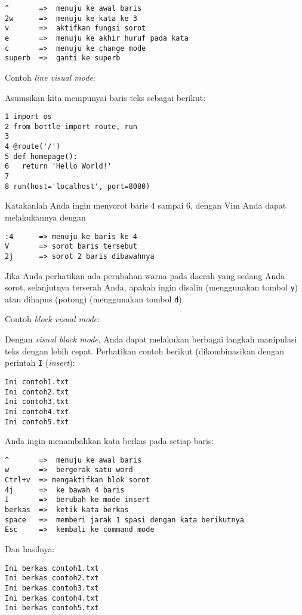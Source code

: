 \documentclass{article}
\begin{document}
\begin{verbatim}
^       =>  menuju ke awal baris
2w      =>  menuju ke kata ke 3
v       =>  aktifkan fungsi sorot
e       =>  menuju ke akhir huruf pada kata
c       =>  menuju ke change mode
superb  =>  ganti ke superb
\end{verbatim}


Contoh \emph{line visual mode}:

Asumsikan kita mempunyai baris teks sebagai berikut:

\begin{verbatim}
1 import os
2 from bottle import route, run
3
4 @route('/')
5 def homepage():
6   return 'Hello World!'
7
8 run(host='localhost', port=8080)
\end{verbatim}

Katakanlah Anda ingin menyorot baris 4 sampai 6, dengan Vim
Anda dapat melakukannya dengan

\begin{verbatim}
:4      => menuju ke baris ke 4
V       => sorot baris tersebut
2j      => sorot 2 baris dibawahnya
\end{verbatim}

Jika Anda perhatikan ada perubahan warna pada daerah yang
sedang Anda sorot, selanjutnya terserah Anda, apakah ingin
disalin (menggunakan tombol \verb=y=) atau dihapus (potong)
(menggunakan tombol \verb=d=).

Contoh \emph{block visual mode}:

Dengan \emph{visual block mode}, Anda dapat melakukan
berbagai langkah manipulasi teks dengan lebih cepat.
Perhatikan contoh berikut (dikombinasikan dengan perintah
\verb=I= (\emph{insert}):

\begin{verbatim}
Ini contoh1.txt
Ini contoh2.txt
Ini contoh3.txt
Ini contoh4.txt
Ini contoh5.txt
\end{verbatim}

Anda ingin menambahkan kata berkas pada setiap baris:

\begin{verbatim}
^       =>  menuju ke awal baris
w       =>  bergerak satu word
Ctrl+v  => mengaktifkan blok sorot
4j      =>  ke bawah 4 baris
I       =>  berubah ke mode insert
berkas  =>  ketik kata berkas
space   =>  memberi jarak 1 spasi dengan kata berikutnya
Esc     =>  kembali ke command mode
\end{verbatim}

Dan hasilnya:

\begin{verbatim}
Ini berkas contoh1.txt
Ini berkas contoh2.txt
Ini berkas contoh3.txt
Ini berkas contoh4.txt
Ini berkas contoh5.txt
\end{verbatim}
\end{document}
